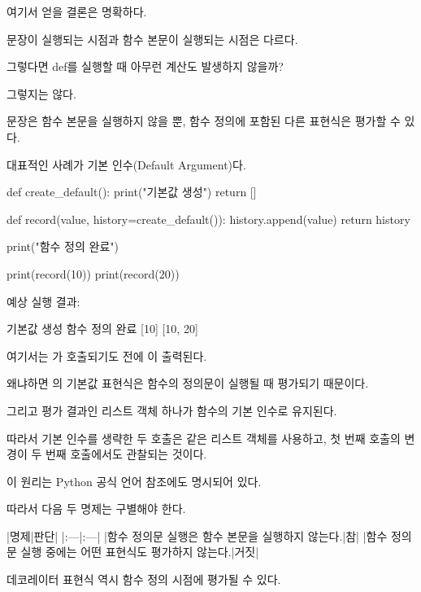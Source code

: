 여기서 얻을 결론은 명확하다.

 문장이 실행되는 시점과 함수 본문이 실행되는 시점은 다르다.

\begin{dhknote}
\begin{dhksmry}[centered]
그렇다면 def를 실행할 때 아무런 계산도 발생하지 않을까?
\end{dhksmry}
\end{dhknote}

그렇지는 않다.

 문장은 함수 본문을 실행하지 않을 뿐, 함수 정의에 포함된 다른 표현식은 평가할 수 있다.

대표적인 사례가 기본 인수(Default Argument)다.

\begin{dhkcode}
def create_default():
    print("기본값 생성")
    return []

def record(value, history=create_default()):
    history.append(value)
    return history

print("함수 정의 완료")

print(record(10))
print(record(20))
\end{dhkcode}

예상 실행 결과:

\begin{dhkzsh}
기본값 생성
함수 정의 완료
[10]
[10, 20]
\end{dhkzsh}

여기서는 가 호출되기도 전에 이 출력된다.

왜냐하면 의 기본값 표현식은  함수의 정의문이 실행될 때 평가되기 때문이다.

그리고 평가 결과인 리스트 객체 하나가 함수의 기본 인수로 유지된다.

따라서 기본 인수를 생략한 두 호출은 같은 리스트 객체를 사용하고, 첫 번째 호출의 변경이 두 번째 호출에서도 관찰되는 것이다.

이 원리는 Python 공식 언어 참조에도 명시되어 있다.

따라서 다음 두 명제는 구별해야 한다.

\begin{dhktable}
|명제|판단|
|:---|:---|
|함수 정의문 실행은 함수 본문을 실행하지 않는다.|참|
|함수 정의문 실행 중에는 어떤 표현식도 평가하지 않는다.|거짓|
\end{dhktable}

데코레이터 표현식 역시 함수 정의 시점에 평가될 수 있다.

